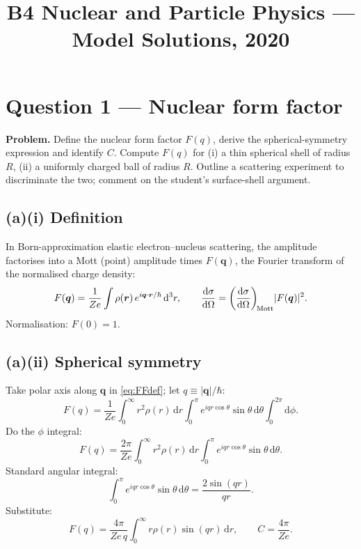\documentclass[11pt]{article}
\title{B4 Nuclear and Particle Physics --- Model Solutions, 2020}
\author{}
\date{}
\newcommand{\de}{\mathrm{d}}
\begin{document}
\maketitle

\section*{Question 1 --- Nuclear form factor}

\textbf{Problem.} Define the nuclear form factor $F(q)$, derive the spherical-symmetry expression and identify $C$. Compute $F(q)$ for (i) a thin spherical shell of radius $R$, (ii) a uniformly charged ball of radius $R$. Outline a scattering experiment to discriminate the two; comment on the student's surface-shell argument.

\subsection*{(a)(i) Definition}

In Born-approximation elastic electron--nucleus scattering, the amplitude factorises into a Mott (point) amplitude times $F(\bm q)$, the Fourier transform of the normalised charge density:
\begin{equation}
F(\bm q)=\frac{1}{Ze}\int \rho(\bm r)\,e^{i\bm q\cdot\bm r/\hbar}\,\de^{3}r,
\qquad \frac{\de\sigma}{\de\Omega}=\left(\frac{\de\sigma}{\de\Omega}\right)_{\!\rm Mott}\!|F(\bm q)|^{2}.
\label{eq:FFdef}
\end{equation}
Normalisation: $F(0)=1$.

\subsection*{(a)(ii) Spherical symmetry}

Take polar axis along $\bm q$ in \eqref{eq:FFdef}; let $q\equiv|\bm q|/\hbar$:
\[
F(q)=\frac{1}{Ze}\int_{0}^{\infty}r^{2}\rho(r)\,\de r\int_{0}^{\pi}e^{iqr\cos\theta}\sin\theta\,\de\theta\int_{0}^{2\pi}\de\phi.
\]
Do the $\phi$ integral:
\[
F(q)=\frac{2\pi}{Ze}\int_{0}^{\infty}r^{2}\rho(r)\,\de r\int_{0}^{\pi}e^{iqr\cos\theta}\sin\theta\,\de\theta.
\]
Standard angular integral:
\[
\int_{0}^{\pi}e^{iqr\cos\theta}\sin\theta\,\de\theta=\frac{2\sin(qr)}{qr}.
\]
Substitute:
\begin{equation}
\boxed{\;F(q)=\frac{4\pi}{Ze\,q}\int_{0}^{\infty}r\rho(r)\sin(qr)\,\de r,\qquad C=\frac{4\pi}{Ze}.\;}
\label{eq:FFsph}
\end{equation}
\end{document}
